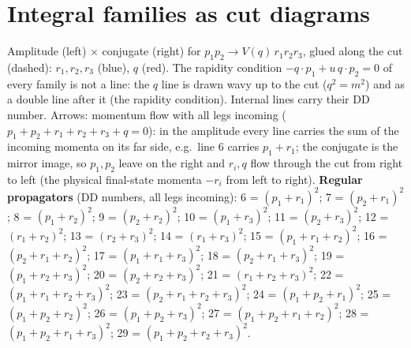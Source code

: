 \documentclass[10pt]{article}
\begin{document}
\section*{Integral families as cut diagrams}
Amplitude (left) $\times$ conjugate (right) for $p_1 p_2 \to V(q)\, r_1 r_2 r_3$, glued along the cut (dashed): $r_1, r_2, r_3$ (blue), $q$ (red). The rapidity condition $-q\cdot p_1 + u\, q\cdot p_2 = 0$ of every family is not a line: the $q$ line is drawn wavy up to the cut ($q^2 = m^2$) and as a double line after it (the rapidity condition). Internal lines carry their DD number. Arrows: momentum flow with all legs incoming ($p_1+p_2+r_1+r_2+r_3+q=0$): in the amplitude every line carries the sum of the incoming momenta on its far side, e.g.\ line 6 carries $p_1+r_1$; the conjugate is the mirror image, so $p_1, p_2$ leave on the right and $r_i, q$ flow through the cut from right to left (the physical final-state momenta $-r_i$ from left to right). \textbf{Regular propagators} (DD numbers, all legs incoming): 6 = $(p_1+r_1)^2$; 7 = $(p_2+r_1)^2$; 8 = $(p_1+r_2)^2$; 9 = $(p_2+r_2)^2$; 10 = $(p_1+r_3)^2$; 11 = $(p_2+r_3)^2$; 12 = $(r_1+r_2)^2$; 13 = $(r_2+r_3)^2$; 14 = $(r_1+r_3)^2$; 15 = $(p_1+r_1+r_2)^2$; 16 = $(p_2+r_1+r_2)^2$; 17 = $(p_1+r_1+r_3)^2$; 18 = $(p_2+r_1+r_3)^2$; 19 = $(p_1+r_2+r_3)^2$; 20 = $(p_2+r_2+r_3)^2$; 21 = $(r_1+r_2+r_3)^2$; 22 = $(p_1+r_1+r_2+r_3)^2$; 23 = $(p_2+r_1+r_2+r_3)^2$; 24 = $(p_1+p_2+r_1)^2$; 25 = $(p_1+p_2+r_2)^2$; 26 = $(p_1+p_2+r_3)^2$; 27 = $(p_1+p_2+r_1+r_2)^2$; 28 = $(p_1+p_2+r_1+r_3)^2$; 29 = $(p_1+p_2+r_2+r_3)^2$.\par\medskip
\end{document}
